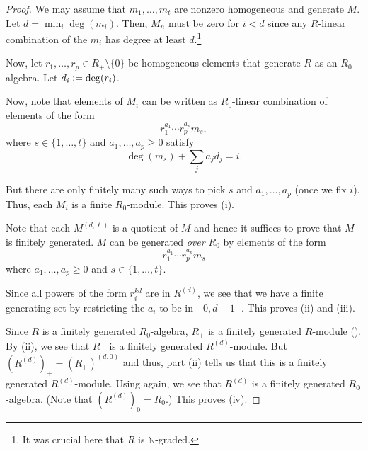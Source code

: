 \documentclass[12pt]{article}
\begin{document}
\begin{proof} 
	We may assume that $m_{1}, \ldots, m_{t}$ are nonzero homogeneous and generate $M$. Let $d = \min_{i} \deg(m_{i})$. Then, $M_{n}$ must be zero for $i < d$ since any $R$-linear combination of the $m_{i}$ has degree at least $d$.\footnote{It was crucial here that $R$ is $\mathbb{N}$-graded.}

	Now, let $r_{1}, \ldots, r_{p} \in R_{+} \setminus \{0\}$ be homogeneous elements that generate $R$ as an $R_{0}$-algebra. Let $d_{i} \vcentcolon= \deg(r_{i})$. 

	Now, note that elements of $M_{i}$ can be written as $R_{0}$-linear combination of elements of the form
	\begin{equation*} 
		r_{1}^{a_{1}} \cdots r_{p}^{a_{p}} m_{s},
	\end{equation*}
	where $s \in \{1, \ldots, t\}$ and $a_{1}, \ldots, a_{p} \ge 0$ satisfy
	\begin{equation*} 
		\deg(m_{s}) + \sum_{j} a_{j} d_{j} = i.
	\end{equation*}

	But there are only finitely many such ways to pick $s$ and $a_{1}, \ldots, a_{p}$ (once we fix $i$). Thus, each $M_{i}$ is a finite $R_{0}$-module. This proves (i).

	Note that each $M^{(d, \ell)}$ is a quotient of $M$ and hence it suffices to prove that $M$ is finitely generated. $M$ can be generated \emph{over $R_{0}$} by elements of the form
	\begin{equation*} 
		r_{1}^{a_{1}} \cdots r_{p}^{a_{p}} m_{s}
	\end{equation*}
	where $a_{1}, \ldots, a_{p} \ge 0$ and $s \in \{1, \ldots, t\}$. 

	Since all powers of the form $r_{i}^{kd}$ are in $R^{(d)}$, we see that we have a finite generating set by restricting the $a_{i}$ to be in $[0, d - 1]$. This proves (ii) and (iii).

	Since $R$ is a finitely generated $R_{0}$-algebra, $R_{+}$ is a finitely generated $R$-module (). By (ii), we see that $R_{+}$ is a finitely generated $R^{(d)}$-module. But $(R^{(d)})_{+} = (R_{+})^{(d, 0)}$ and thus, part (ii) tells us that this is a finitely generated $R^{(d)}$-module. Using  again, we see that $R^{(d)}$ is a finitely generated $R_{0}$-algebra. (Note that $(R^{(d)})_{0} = R_{0}$.) \newline
	This proves (iv). 
\end{proof}
\end{document}
